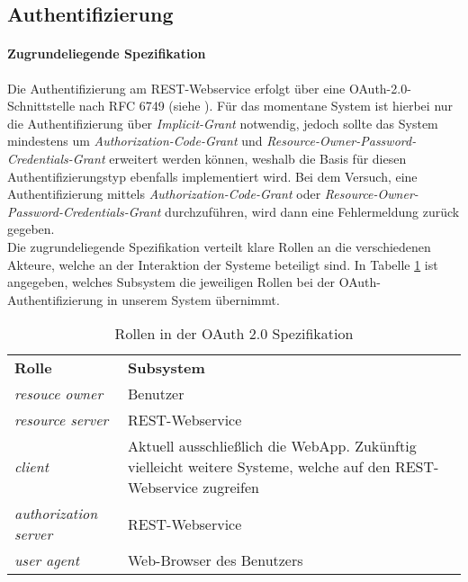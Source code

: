 \FloatBarrier
\subsection{Authentifizierung}
\label{subsec:api-auth}
\paragraph{Zugrundeliegende Spezifikation} Die Authentifizierung am REST-Webservice erfolgt über eine OAuth-2.0-Schnittstelle nach RFC 6749 (siehe \cite{rfc6749}).
Für das momentane System ist hierbei nur die Authentifizierung über \textit{Implicit-Grant} \cite[Kap. 4.2]{rfc6749} notwendig, jedoch sollte das System mindestens um \textit{Authorization-Code-Grant} \cite[Kap. 4.1]{rfc6749} und \textit{Resource-Owner-Password-Credentials-Grant} \cite[Kap. 4.3]{rfc6749} erweitert werden können, weshalb die Basis für diesen Authentifizierungstyp ebenfalls implementiert wird. Bei dem Versuch, eine Authentifizierung mittels \textit{Authorization-Code-Grant} oder \textit{Resource-Owner-Password-Credentials-Grant} durchzuführen, wird dann eine Fehlermeldung zurück gegeben.\\
Die zugrundeliegende Spezifikation verteilt klare Rollen an die verschiedenen Akteure, welche an der Interaktion der Systeme beteiligt sind. In Tabelle \ref{tab:api-auth-roles} ist angegeben, welches Subsystem die jeweiligen Rollen bei der OAuth-Authentifizierung in unserem System übernimmt.

\begin{table}
	\begin{tabular}{@{} | p{} | p{} | @{}} 
		\hline
		\textbf{Rolle} & \textbf{Subsystem}\\ \hhline{|=|=|}
		\textit{resouce owner} & Benutzer \\ \hline
		\textit{resource server} & REST-Webservice \\ \hline
		\textit{client} & Aktuell ausschließlich die WebApp. Zukünftig vielleicht weitere Systeme, welche auf den REST-Webservice zugreifen \\ \hline
		\textit{authorization server} & REST-Webservice \\ \hline
		\textit{user agent} & Web-Browser des Benutzers \\
		\hline
	\end{tabular}
	\caption{Rollen in der OAuth 2.0 Spezifikation}
	\label{tab:api-auth-roles}
\end{table}

